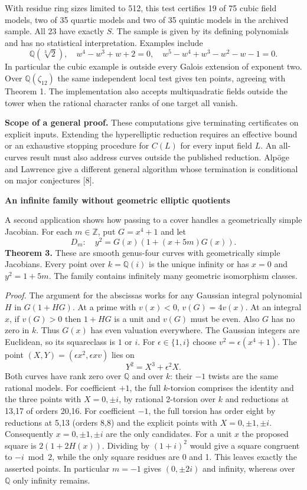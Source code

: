 \documentclass[12pt]{article}
\newcommand{\Q}{\mathbb Q}\newcommand{\Z}{\mathbb Z}
\newcommand{\head}[1]{{\Large\bfseries\color{ink}#1}\par\vspace{3pt}}
\begin{document}
With residue ring sizes limited to 512, this test certifies 19 of 75 cubic field models, two of 35 quartic models and two of 35 quintic models in the archived sample. All 23 have exactly $S$. The sample is given by its defining polynomials and has no statistical interpretation. Examples include
\[
   \Q(\sqrt[3]2),\quad w^4-w^3+w+2=0,\quad
   w^5-w^4+w^3-w^2-w-1=0.
\]
In particular the cubic example is outside every Galois extension of exponent two. Over $\Q(\zeta_{12})$ the same independent local test gives ten points, agreeing with Theorem 1. The implementation also accepts multiquadratic fields outside the tower when the rational character ranks of one target all vanish.

\textbf{Scope of a general proof.} These computations give terminating certificates on explicit inputs. Extending the hyperelliptic reduction requires an effective bound or an exhaustive stopping procedure for $C(L)$ for every input field $L$. An all-curves result must also address curves outside the published reduction. Alpöge and Lawrence give a different general algorithm whose termination is conditional on major conjectures [8].

\newpage
\head{An infinite family without geometric elliptic quotients}
A second application shows how passing to a cover handles a geometrically simple Jacobian. For each $m\in\Z$, put $G=x^4+1$ and let
\[
 D_m:\quad y^2=G(x)\left(1+(x+5m)G(x)\right).
\]
\textbf{Theorem 3.} These are smooth genus-four curves with geometrically simple Jacobians. Every point over $k=\Q(i)$ is the unique infinity or has $x=0$ and $y^2=1+5m$. The family contains infinitely many geometric isomorphism classes.

\textit{Proof.} The argument for the abscissas works for any Gaussian integral polynomial $H$ in $G(1+HG)$. At a prime with $v(x)<0$, $v(G)=4v(x)$. At an integral $x$, if $v(G)>0$ then $1+HG$ is a unit and $v(G)$ must be even. Also $G$ has no zero in $k$. Thus $G(x)$ has even valuation everywhere. The Gaussian integers are Euclidean, so its squareclass is $1$ or $i$. For $\epsilon\in\{1,i\}$ choose $v^2=\epsilon(x^4+1)$. The point $(X,Y)=(\epsilon x^2,\epsilon xv)$ lies on
\[
                       Y^2=X^3+\epsilon^2X .
\]
Both curves have rank zero over $\Q$ and over $k$: their $-1$ twists are the same rational models. For coefficient $+1$, the full $k$-torsion comprises the identity and the three points with $X=0,\pm i$, by rational 2-torsion over $k$ and reductions at 13,17 of orders 20,16. For coefficient $-1$, the full torsion has order eight by reductions at 5,13 (orders 8,8) and the explicit points with $X=0,\pm1,\pm i$. Consequently $x=0,\pm1,\pm i$ are the only candidates. For a unit $x$ the proposed square is $2(1+2H(x))$. Dividing by $(1+i)^2$ would give a square congruent to $-i\bmod 2$, while the only square residues are 0 and 1. This leaves exactly the asserted points. In particular $m=-1$ gives $(0,\pm2i)$ and infinity, whereas over $\Q$ only infinity remains.
\end{document}
